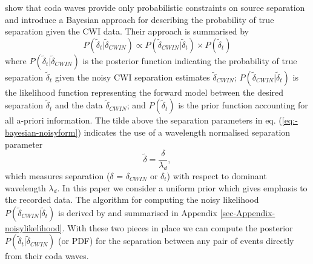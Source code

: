 \documentclass[extra]{gji}
\begin{document}
\citet{dr_Robinson10b} show that coda waves provide
only probabilistic constraints on source separation and
introduce a Bayesian approach for describing the probability
of true separation given the CWI data. Their approach is
summarised by
\begin{equation}
\label{eq:-bayesian-noisyform}
P(\widetilde{\delta}_t|\widetilde{\delta}_{CWIN}) \propto P(\widetilde{\delta}_{CWIN}|\widetilde{\delta}_t)
\times P(\widetilde{\delta}_t)
\end{equation}
where  $P(\widetilde{\delta}_t|\widetilde{\delta}_{CWIN})$ is the posterior function
indicating the probability of true separation $\widetilde{\delta}_t$ given the noisy CWI separation
estimates $\widetilde{\delta}_{CWIN}$; $P(\widetilde{\delta}_{CWIN}|\widetilde{\delta}_t)$
is the likelihood function representing the forward model between the
desired separation $\widetilde{\delta}_t$ and the data $\widetilde{\delta}_{CWIN}$; and
$P(\widetilde{\delta}_t)$ is the prior function accounting for all a-priori information.
The tilde above the separation parameters in eq. (\ref{eq:-bayesian-noisyform})
indicates the use of a wavelength normalised separation parameter
\begin{equation}
\label{eq-normalisation-eqn}
\widetilde{\delta} = \frac{\delta}{\lambda_{d}},
\end{equation}
which measures separation ($\delta$ = $\delta_{CWIN}$ or $\delta_t$) with
respect to dominant wavelength $\lambda_{d}$.
In this paper we consider a uniform prior which gives emphasis to the recorded data.
The algorithm for computing the noisy
likelihood $P(\widetilde{\delta}_{CWIN}|\widetilde{\delta}_t)$ is derived by \citet{dr_Robinson10b}
and summarised in Appendix \ref{sec-Appendix-noisylikelihood}. With these two pieces
in place we can compute the posterior $P(\widetilde{\delta}_t|\widetilde{\delta}_{CWIN})$
(or PDF) for the separation between any pair of events directly from their coda waves.
\end{document}
